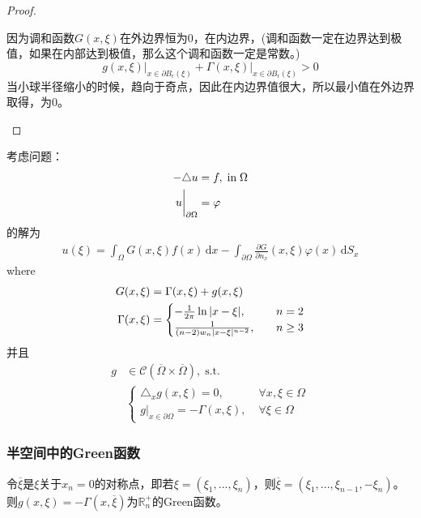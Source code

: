 \documentclass[11pt, a4paper]{article}
\theoremstyle{theorem}
\newcommand{\intd}[1]{\,\mathrm{d}{#1}}
\begin{document}
\begin{proof}
\begin{enumerate}[(i)]
    因为调和函数$G(x,\xi)$在外边界恒为0，在内边界，(调和函数一定在边界达到极值，如果在内部达到极值，那么这个调和函数一定是常数。)
    $$
    g(x,\xi)\bigg|_{x \in \partial B_\epsilon(\xi)} + \Gamma(x,\xi)\bigg|_{x \in \partial B_\epsilon(\xi)} > 0
    $$
    当小球半径缩小的时候，趋向于奇点，因此在内边界值很大，所以最小值在外边界取得，为0。
\end{enumerate}

\end{proof}

考虑问题：
\begin{align}
\label{Q5-1-9}
    - \triangle u &= f, \; \text{in} \; \Omega \notag \\
    u \bigg|_{\partial \Omega} &= \varphi
\end{align}
的解为
\begin{align}
    u(\xi) = \int_\Omega G(x,\xi) f(x) \intd x - \int_{\partial \Omega} \frac{\partial G}{\partial n_x}(x,\xi) \varphi(x) \intd S_x
\end{align}
where
\begin{align}
\label{eq5-1-9}
    G(x,\xi) &= \Gamma(x,\xi) + g(x,\xi) \notag \\
    \Gamma(x,\xi) &= \begin{cases}
    - \frac{1}{2\pi} \ln |x - \xi|, \quad &n = 2 \\
    \frac{1}{(n-2) w_n|x - \xi|^{n-2}}, \quad &n \geq 3
    \end{cases}
\end{align}
并且
\begin{align*}
    g &\in \mathcal{C}(\overline{\Omega} \times \overline{\Omega}), \; \text{s.t.} \; \\
    &\begin{cases}
    \triangle_x g(x,\xi) = 0, \; &\forall x,\xi \in \Omega \\
    g \bigg|_{x \in \partial \Omega} = - \Gamma(x,\xi), \; &\forall \xi \in \Omega
    \end{cases}
\end{align*}

\subsubsection{半空间中的Green函数}

令$\overline{\xi}$是$\xi$关于$x_n = 0$的对称点，即若$\xi = (\xi_1, ..., \xi_n)$，则$\overline{\xi} = (\xi_1, ..., \xi_{n-1}, - \xi_n)$。则$g(x,\xi) = - \Gamma(x,\overline{\xi})$为$\mathbb{R}_n^+$的Green函数。
\end{document}
